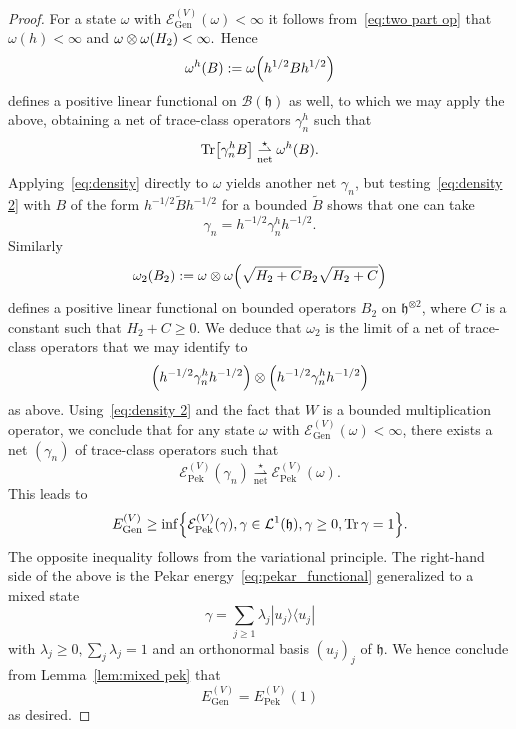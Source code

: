 \documentclass[AHL,Unicode,longabstracts,published]{cedram}
\DeclareMathOperator{\Tr}{Tr}
\DeclareMathOperator{\Pek}{Pek}
\DeclareMathOperator{\Genn}{Gen}
\newcommand{\cL}{\mathcal{L}}
\newcommand{\gh}{\mathfrak{h}}
\newcommand{\cB}{\mathcal{B}}
\newcommand{\cE}{\mathcal{E}}
\newcommand{\1}{\mathds{1}}
\newcommand{\cvnet}{\overset{\star}{\underset{\mathrm{net}}{\rightharpoonup}}}
\let\oldin\in
\renewcommand{\in}{\mathchoice{\oldin}{\oldin}{\,\oldin\,}{\,\oldin\,}}
\let\originalleft\left
\let\originalright\right
\renewcommand{\left}{\mathopen{}\mathclose\bgroup\originalleft}
\renewcommand{\right}{\aftergroup\egroup\originalright}
\begin{document}
\begin{proof}
For a state $\omega$ with $\cE_{\Genn}^{(V)}(\omega)<\infty$ it follows from~\eqref{eq:two part op} that $\omega (h) < \infty$ and $ \omega \otimes \omega \left(H_2 \right) < \infty.$ Hence
\begin{equation*}
\omega ^h (B) := \omega \left(h^{1/2} B h^{1/2}\right)
\end{equation*}
defines a positive linear functional on $\cB (\gh)$ as well, to which we may apply the above, obtaining a net of trace-class operators $\gamma_n^h$ such that
\begin{equation}\label{eq:density 2}
\Tr \left[\gamma_n^h B \right] \cvnet \omega^h (B).
\end{equation}
Applying~\eqref{eq:density} directly to $\omega$ yields another net $\gamma_n$, but testing~\eqref{eq:density 2} with $B$ of the form $h^{-1/2} \widetilde{B} h^{-1/2}$ for a bounded $\widetilde{B}$ shows that one can take
\begin{equation*}
\gamma_n = h^{-1/2} \gamma_n ^h h ^{-1/2}.
\end{equation*}
Similarly
\begin{equation*}
\omega_2 (B_2) := \omega \otimes \omega \left(\sqrt{H_2 +C} B_2 \sqrt{H_2 +C} \right)
\end{equation*}
defines a positive linear functional on bounded operators $B_2$ on $\gh^{\otimes 2}$, where $C$ is a constant such that $H_2 + C \geq 0$. We deduce that $\omega_2$ is the limit of a net of trace-class operators that we may identify to
\begin{equation*}
\left(h^{-1/2} \gamma_n ^h h ^{-1/2}\right) \otimes \left(h^{-1/2} \gamma_n ^h h ^{-1/2}\right)
\end{equation*}
as above. Using~\eqref{eq:density 2} and the fact that $W$ is a bounded multiplication operator, we conclude that for any state $\omega$ with $\cE_{\Genn}^{(V)}(\omega)<\infty$, there exists a net $(\gamma_n)$ of trace-class operators such that
\begin{equation*}
\cE_{\Pek}^{(V)}(\gamma_n) \cvnet \cE_{\Pek}^{(V)}(\omega).
\end{equation*}
This leads to
\begin{equation}\label{eq:gen ener 2}
E_{\Genn}^{(V)}\geq \inf\left\lbrace \cE_{\Pek}^{(V)}(\gamma), \gamma \in \cL^1(\gh), \gamma \geq 0, \Tr \gamma = 1\right\rbrace.
\end{equation}
The opposite inequality follows from the variational principle. The right-hand side of the above is the Pekar energy~\eqref{eq:pekar_functional} generalized to a mixed state
\begin{equation*}
\gamma = \sum_{j\geq 1} \lambda_j |u_j\rangle \langle u_j|
\end{equation*}
with $\lambda_j \geq 0, \sum_j \lambda_j = 1$ and an orthonormal basis $(u_j)_j$ of $\gh$. We hence conclude from Lemma~\ref{lem:mixed pek} that
\begin{equation*}
E_{\Genn}^{(V)} = E^{(V)}_{\Pek}(1)
\end{equation*}
as desired.
\end{proof}
\end{document}

